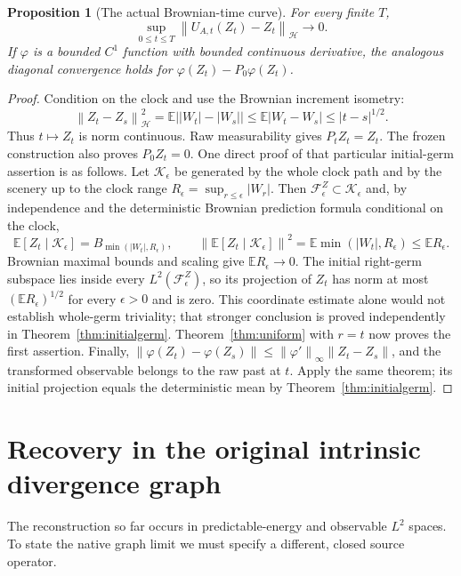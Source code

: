 \documentclass[11pt]{article}
\newtheorem{proposition}[theorem]{Proposition}
\theoremstyle{remark}\newtheorem{remark}[theorem]{Remark}
\newcommand{\E}{\mathbb E}
\newcommand{\norm}[1]{\left\lVert#1\right\rVert}
\newcommand{\HH}{\mathcal H}
\begin{document}
\begin{proposition}[The actual Brownian-time curve]\label{prop:actual}
For every finite $T$,
\[
 \sup_{0\leq t\leq T}\norm{U_{A,t}(Z_t)-Z_t}_{\HH}
 \longrightarrow0.
\]
If $\varphi$ is a bounded $C^1$ function with bounded continuous
derivative, the analogous diagonal convergence holds for
$\varphi(Z_t)-P_0\varphi(Z_t)$.
\end{proposition}
\begin{proof}
Condition on the clock and use the Brownian increment isometry:
\[
 \norm{Z_t-Z_s}_{\HH}^2
  =\E\bigl||W_t|-|W_s|\bigr|
  \leq\E|W_t-W_s|\leq|t-s|^{1/2}.
\]
Thus $t\mapsto Z_t$ is norm continuous. Raw measurability gives
$P_tZ_t=Z_t$. The frozen construction also proves $P_0Z_t=0$.
One direct proof of that particular initial-germ assertion is as
follows. Let $\mathcal K_\epsilon$ be generated by the whole clock
path and by the scenery up to the clock range
$R_\epsilon=\sup_{r\leq\epsilon}|W_r|$. Then
$\mathcal F_\epsilon^Z\subset\mathcal K_\epsilon$ and, by independence
and the deterministic Brownian prediction formula conditional on the
clock,
\[
 \E[Z_t\mid\mathcal K_\epsilon]
   =B_{\min(|W_t|,R_\epsilon)},\qquad
 \norm{\E[Z_t\mid\mathcal K_\epsilon]}^2
   =\E\min(|W_t|,R_\epsilon)\leq\E R_\epsilon.
\]
Brownian maximal bounds and scaling give
$\E R_\epsilon\to0$. The initial right-germ subspace lies inside
every $L^2(\mathcal F_\epsilon^Z)$, so its projection of $Z_t$ has
norm at most $(\E R_\epsilon)^{1/2}$ for every $\epsilon>0$ and
is zero. This coordinate estimate alone would not establish whole-germ
triviality; that stronger conclusion is proved independently in
Theorem~\ref{thm:initialgerm}. Theorem~\ref{thm:uniform} with $r=t$ now proves the first
assertion. Finally,
$\norm{\varphi(Z_t)-\varphi(Z_s)}\leq
\norm{\varphi'}_\infty\norm{Z_t-Z_s}$, and the transformed
observable belongs to the raw past at $t$. Apply the same theorem;
its initial projection equals the deterministic mean by
Theorem~\ref{thm:initialgerm}.
\end{proof}

\section{Recovery in the original intrinsic divergence graph}
The reconstruction so far occurs in predictable-energy and observable
$L^2$ spaces. To state the native graph limit we must specify a
different, closed source operator.
\end{document}

